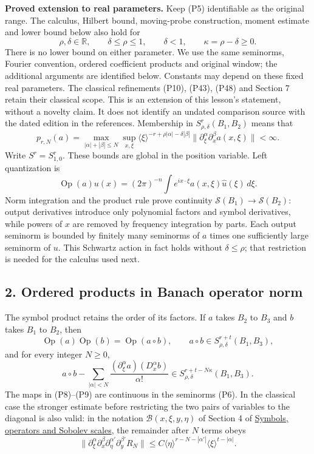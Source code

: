 \documentclass[
  11pt,
]{article}
\begin{document}
\textbf{Proved extension to real parameters.} Keep (P5) identifiable as
the original range. The calculus, Hilbert bound, moving-probe
construction, moment estimate and lower bound below also hold for \[
 \rho,\delta\in\mathbb R,\qquad\delta\leq\rho\leq1,\qquad\delta<1,
 \qquad\kappa=\rho-\delta\geq0.
 \tag{P5e}
\] There is no lower bound on either parameter. We use the same
seminorms, Fourier convention, ordered coefficient products and original
window; the additional arguments are identified below. Constants may
depend on these fixed real parameters. The classical refinements (P10),
(P43), (P48) and Section 7 retain their classical scope. This is an
extension of this lesson's statement, without a novelty claim. It does
not identify an undated comparison source with the dated edition in the
references. Membership in \(S^r_{\rho,\delta}(B_1,B_2)\) means that \[
 p_{r,N}(a)=\max_{|\alpha|+|\beta|\leq N}
 \sup_{x,\xi}\langle\xi\rangle^{-r+\rho|\alpha|-\delta|\beta|}
 \|\partial_\xi^\alpha\partial_x^\beta a(x,\xi)\|<\infty.
\tag{P6}
\] Write \(S^r=S^r_{1,0}\). These bounds are global in the position
variable. Left quantization is \[
 \operatorname{Op}(a)u(x)=(2\pi)^{-n}
 \int e^{ix\cdot\xi}a(x,\xi)\widehat u(\xi)\,d\xi.
\tag{P7}
\] Norm integration and the product rule prove continuity
\(\mathcal S(B_1)\to\mathcal S(B_2)\): output derivatives introduce only
polynomial factors and symbol derivatives, while powers of \(x\) are
removed by frequency integration by parts. Each output seminorm is
bounded by finitely many seminorms of \(a\) times one sufficiently large
seminorm of \(u\). This Schwartz action in fact holds without
\(\delta\leq\rho\); that restriction is needed for the calculus used
next.

\subsection{2. Ordered products in Banach operator
norm}\label{ordered-products-in-banach-operator-norm}

The symbol product retains the order of its factors. If \(a\) takes
\(B_2\) to \(B_3\) and \(b\) takes \(B_1\) to \(B_2\), then \[
 \operatorname{Op}(a)\operatorname{Op}(b)=\operatorname{Op}(a\circ b),
 \qquad a\circ b\in S^{r+t}_{\rho,\delta}(B_1,B_3),
\tag{P8}
\] and for every integer \(N\geq0\), \[
 a\circ b-\sum_{|\alpha|<N}
 \frac{(\partial_\xi^\alpha a)(D_x^\alpha b)}{\alpha!}
 \in S^{r+t-N\kappa}_{\rho,\delta}(B_1,B_3).
\tag{P9}
\] The maps in (P8)--(P9) are continuous in the seminorms (P6). In the
classical case the stronger estimate before restricting the two pairs of
variables to the diagonal is also valid: in the notation
\(\mathcal B(x,\xi,y,\eta)\) of Section 4 of
\href{euclidean-symbol-calculus.pdf}{Symbols, operators and Sobolev
scales}, the remainder after \(N\) terms obeys \[
 \|\partial_\xi^\alpha\partial_x^\beta
 \partial_\eta^{\alpha'}\partial_y^{\beta'}R_N\|
 \leq C\langle\eta\rangle^{r-N-|\alpha'|}
          \langle\xi\rangle^{t-|\alpha|}.
\tag{P10}
\]
\end{document}
